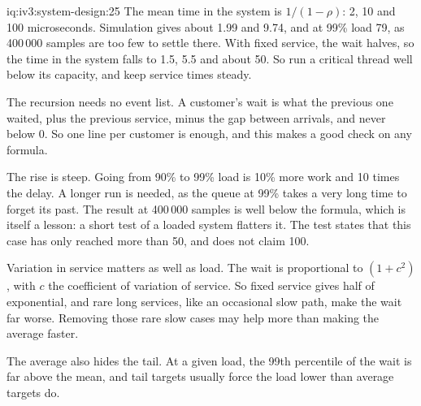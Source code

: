 \begin{solution}{iq:iv3:system-design:25}
The mean time in the system is $1 / (1 - \rho)$: 2, 10 and 100 microseconds. Simulation gives about 1.99 and 9.74, and at 99\% load 79, as 400\,000 samples are too few to settle there. With fixed service, the wait halves, so the time in the system falls to 1.5, 5.5 and about 50. So run a critical thread well below its capacity, and keep service times steady.
\label{lst:iv3:sd:queue}

The recursion needs no event list. A customer's wait is what the previous one waited, plus the previous service, minus the gap between arrivals, and never below 0. So one line per customer is enough, and this makes a good check on any formula.

The rise is steep. Going from 90\% to 99\% load is 10\% more work and 10 times the delay. A longer run is needed, as the queue at 99\% takes a very long time to forget its past. The result at 400\,000 samples is well below the formula, which is itself a lesson: a short test of a loaded system flatters it. The test states that this case has only reached more than 50, and does not claim 100.

Variation in service matters as well as load. The wait is proportional to $(1 + c^2)$, with $c$ the coefficient of variation of service. So fixed service gives half of exponential, and rare long services, like an occasional slow path, make the wait far worse. Removing those rare slow cases may help more than making the average faster.

The average also hides the tail. At a given load, the 99th percentile of the wait is far above the mean, and tail targets usually force the load lower than average targets do.

\end{solution}

